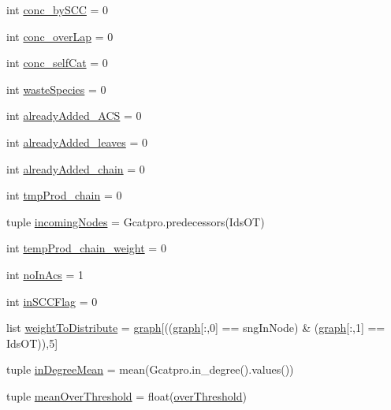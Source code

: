 \begin{DoxyCompactItemize}
int \hyperlink{a00096_aac2f508d526d62bd7f9d4f5a5f8b1821}{conc\-\_\-by\-S\-C\-C} = 0
\item 
int \hyperlink{a00096_afd3169174539244248b78c8da2bba265}{conc\-\_\-over\-Lap} = 0
\item 
int \hyperlink{a00096_a9e8cc07f7d7f892f3f72274318dcbcef}{conc\-\_\-self\-Cat} = 0
\item 
int \hyperlink{a00096_ace0de61f3c6aa14b4197156be3a68280}{waste\-Species} = 0
\item 
int \hyperlink{a00096_a38f20e6b1cad6a61f1c9b87b37c76f63}{already\-Added\-\_\-\-A\-C\-S} = 0
\item 
int \hyperlink{a00096_ac842390795cf193351c795945cde8e77}{already\-Added\-\_\-leaves} = 0
\item 
int \hyperlink{a00096_ac1b286545469555eb284f9b5f2bd984f}{already\-Added\-\_\-chain} = 0
\item 
int \hyperlink{a00096_aee6b4f50387d471b70458cf703c0863b}{tmp\-Prod\-\_\-chain} = 0
\item 
tuple \hyperlink{a00096_a540ba5319ee67d8a2323099dad73ba36}{incoming\-Nodes} = Gcatpro.\-predecessors(Ids\-O\-T)
\item 
int \hyperlink{a00096_aaf17c99825e0961e4cfaa173ddfffe84}{temp\-Prod\-\_\-chain\-\_\-weight} = 0
\item 
int \hyperlink{a00096_a4766b3ca835449f1aa287fda699c7f96}{no\-In\-Acs} = 1
\item 
int \hyperlink{a00096_a6405b6b05e7b87812422cc30d2034904}{in\-S\-C\-C\-Flag} = 0
\item 
list \hyperlink{a00096_a5162bfbe5eb2618736d1f77bb3125a9b}{weight\-To\-Distribute} = \hyperlink{a00096_ab45392da38059bf7557c22cbc73e5580}{graph}\mbox{[}((\hyperlink{a00096_ab45392da38059bf7557c22cbc73e5580}{graph}\mbox{[}\-:,0\mbox{]} == sng\-In\-Node) \& (\hyperlink{a00096_ab45392da38059bf7557c22cbc73e5580}{graph}\mbox{[}\-:,1\mbox{]} == Ids\-O\-T)),5\mbox{]}
\item 
tuple \hyperlink{a00096_a5004d18b8cfa2803620a9cd7f32d9775}{in\-Degree\-Mean} = mean(Gcatpro.\-in\-\_\-degree().values())
\item 
tuple \hyperlink{a00096_af10c3623be709892f4bdc4df5a3d52b0}{mean\-Over\-Threshold} = float(\hyperlink{a00096_a12e61f8d7aadb52256a7728af342bae3}{over\-Threshold})
\end{DoxyCompactItemize}


